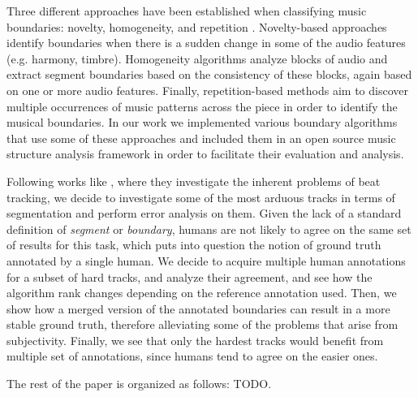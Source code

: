 \documentclass{article}
\begin{document}
Three different approaches have been established when classifying music boundaries: novelty, homogeneity, and repetition \cite{Paulus2010}. 
Novelty-based approaches identify boundaries when there is a sudden change in some of the audio features (e.g. harmony, timbre).
Homogeneity algorithms analyze blocks of audio and extract segment boundaries based on the consistency of these blocks, again based on one or more audio features.
Finally, repetition-based methods aim to discover multiple occurrences of music patterns across the piece in order to identify the musical boundaries.
In our work we implemented various boundary algorithms that use some of these approaches and included them in an open source music structure analysis framework in order to facilitate their evaluation and analysis.

Following works like \cite{Grosche2010}, where they investigate the inherent problems of beat tracking, we decide to investigate some of the most arduous tracks in terms of segmentation and perform error analysis on them.
Given the lack of a standard definition of \emph{segment} or \emph{boundary}, humans are not likely to agree on the same set of results for this task, which puts into question the notion of ground truth annotated by a single human.
We decide to acquire multiple human annotations for a subset of hard tracks, and analyze their agreement, and see how the algorithm rank changes depending on the reference annotation used.
Then, we show how a merged version of the annotated boundaries can result in a more stable ground truth, therefore alleviating some of the problems that arise from subjectivity.
Finally, we see that only the hardest tracks would benefit from multiple set of annotations, since humans tend to agree on the easier ones.

The rest of the paper is organized as follows: TODO.





\end{document}
